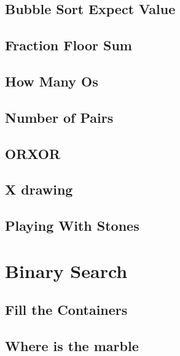         \subsection{Bubble Sort Expect Value}
                
        \subsection{Fraction Floor Sum}
                
        \subsection{How Many Os}
                
        \subsection{Number of Pairs}
                
        \subsection{ORXOR}
                
        \subsection{X drawing}
                
        \subsection{Playing With Stones}
                

\section{Binary Search}
        \subsection{Fill the Containers}
                
        \subsection{Where is the marble}
                

